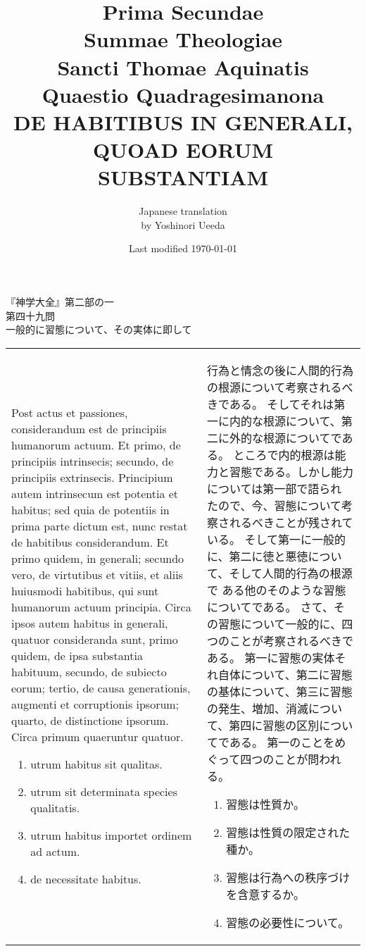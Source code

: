 \documentclass[10pt]{jsarticle} %
\title{{\bf Prima Secundae}\\{\HUGE Summae Theologiae}\\Sancti Thomae
Aquinatis\\{\sffamily Quaestio Quadragesimanona}\\{\bf DE HABITIBUS IN GENERALI,\\QUOAD EORUM SUBSTANTIAM}}
\author{Japanese translation\\by Yoshinori {\sc Ueeda}}
\date{Last modified \today}
\begin{document}
\maketitle

\begin{center}
{\Large 『神学大全』第二部の一\\第四十九問\\
一般的に習態について、その実体に即して}
\end{center}

\newpage
\begin{longtable}{p{21em}p{21em}}

Post actus et passiones, considerandum est de principiis humanorum
actuum. Et primo, de principiis intrinsecis; secundo, de principiis
extrinsecis. Principium autem intrinsecum est potentia et habitus; sed
quia de potentiis in prima parte dictum est, nunc restat de habitibus
considerandum. Et primo quidem, in generali; secundo vero, de
virtutibus et vitiis, et aliis huiusmodi habitibus, qui sunt humanorum
actuum principia. Circa ipsos autem habitus in generali, quatuor
consideranda sunt, primo quidem, de ipsa substantia habituum, secundo,
de subiecto eorum; tertio, de causa generationis, augmenti et
corruptionis ipsorum; quarto, de distinctione ipsorum. Circa primum
quaeruntur quatuor. 

\begin{enumerate}
 \item utrum habitus sit qualitas. 
 \item utrum sit determinata species qualitatis.
 \item utrum habitus importet ordinem ad actum.
 \item de necessitate habitus.
\end{enumerate}


&

行為と情念の後に人間的行為の根源について考察されるべきである。
そしてそれは第一に内的な根源について、第二に外的な根源についてである。
ところで内的根源は能力と習態である。しかし能力については第一部で語られ
たので、今、習態について考察されるべきことが残されている。
そして第一に一般的に、第二に徳と悪徳について、そして人間的行為の根源で
ある他のそのような習態についてである。
さて、その習態について一般的に、四つのことが考察されるべきである。
第一に習態の実体それ自体について、第二に習態の基体について、第三に習態
 の発生、増加、消滅について、第四に習態の区別についてである。
第一のことをめぐって四つのことが問われる。

\begin{enumerate}
 \item 習態は性質か。
 \item 習態は性質の限定された種か。
 \item 習態は行為への秩序づけを含意するか。
 \item 習態の必要性について。
\end{enumerate}




\end{longtable}
\end{document}
